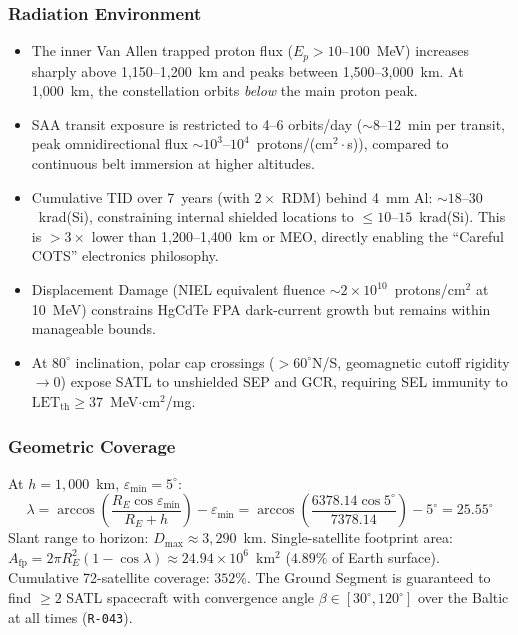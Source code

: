\subsubsection{Radiation Environment}
\begin{itemize}
    \item The inner Van Allen trapped proton flux ($E_p > 10$--$100$~MeV) increases sharply above 1,150--1,200~km and peaks between 1,500--3,000~km. At 1,000~km, the constellation orbits \emph{below} the main proton peak.
    \item SAA transit exposure is restricted to 4--6 orbits/day (${\sim}8$--$12$~min per transit, peak omnidirectional flux ${\sim}10^3$--$10^4$~protons/(cm$^2 \cdot$s)), compared to continuous belt immersion at higher altitudes.
    \item Cumulative TID over 7~years (with $2\times$ RDM) behind 4~mm Al: ${\sim}18$--$30$~krad(Si), constraining internal shielded locations to $\le 10$--$15$~krad(Si). This is $> 3\times$ lower than 1,200--1,400~km or MEO, directly enabling the ``Careful COTS'' electronics philosophy.
    \item Displacement Damage (NIEL equivalent fluence ${\sim}2 \times 10^{10}$~protons/cm$^2$ at 10~MeV) constrains HgCdTe FPA dark-current growth but remains within manageable bounds.
    \item At $80^\circ$ inclination, polar cap crossings ($> 60^\circ$N/S, geomagnetic cutoff rigidity $\rightarrow 0$) expose SATL to unshielded SEP and GCR, requiring SEL immunity to $\text{LET}_{\text{th}} \ge 37$~MeV$\cdot$cm$^2$/mg.
\end{itemize}

\subsubsection{Geometric Coverage}
At $h = 1{,}000$~km, $\varepsilon_{\min} = 5^\circ$:
\[
    \lambda = \arccos\!\left(\frac{R_E \cos\varepsilon_{\min}}{R_E + h}\right) - \varepsilon_{\min} = \arccos\!\left(\frac{6378.14 \cos 5^\circ}{7378.14}\right) - 5^\circ = 25.55^\circ
\]
Slant range to horizon: $D_{\max} \approx 3{,}290$~km. Single-satellite footprint area: $A_{\text{fp}} = 2\pi R_E^2(1 - \cos\lambda) \approx 24.94 \times 10^6$~km$^2$ ($4.89\%$ of Earth surface). Cumulative 72-satellite coverage: $352\%$. The Ground Segment is guaranteed to find $\ge 2$ SATL spacecraft with convergence angle $\beta \in [30^\circ, 120^\circ]$ over the Baltic at all times (\texttt{R-043}).

